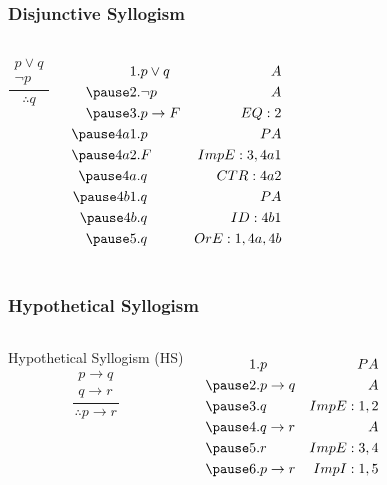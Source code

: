 \documentclass[dvipsnames]{beamer}
\begin{document}
\begin{frame}
  \frametitle{Disjunctive Syllogism}

  \begin{columns}
    \[
    \frac
      {
        \begin{array}{c}
          p \vee q\\
          \neg p
        \end{array}
      }
      {
        \therefore q
      }
    \]

    \pause
    \begin{eqnarray*}
      1.   & p \vee q        & A\\
      \pause
      2.   & \neg p          & A\\
      \pause
      3.   & p \rightarrow F & EQ:2\\
      \pause
      4a1. & p               & PA\\
      \pause
      4a2. & F               & ImpE:3,4a1\\
      \pause
      4a.  & q               & CTR:4a2\\
      \pause
      4b1. & q               & PA\\
      \pause
      4b.  & q               & ID:4b1\\
      \pause
      5.   & q               & OrE:1,4a,4b
    \end{eqnarray*}
  \end{columns}
\end{frame}

\begin{frame}
  \frametitle{Hypothetical Syllogism}

  \begin{columns}
    \begin{block}{Hypothetical Syllogism (HS)}
      \[
      \frac
        {
          \begin{array}{c}
            p \rightarrow q\\
            q \rightarrow r
          \end{array}}
        {
          \therefore p \rightarrow r
        }
      \]
    \end{block}

    \pause
    \begin{eqnarray*}
      1. & p               & PA\\
      \pause
      2. & p \rightarrow q & A\\
      \pause
      3. & q               & ImpE:1,2\\
      \pause
      4. & q \rightarrow r & A\\
      \pause
      5. & r               & ImpE:3,4\\
      \pause
      6. & p \rightarrow r & ImpI:1,5\\
    \end{eqnarray*}
  \end{columns}
\end{frame}
\end{document}
